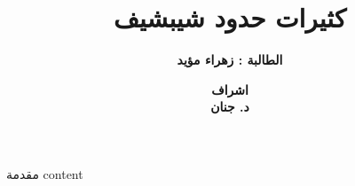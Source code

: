 


	\author{\textbf{الطالبة : زهراء مؤيد}}
	\title{\textbf{كثيرات حدود شيبشيف}}
	\date{\textbf{اشراف\\
		د. جنان}}
	
	\begin{frame}
		\maketitle
	\end{frame}
	
	\begin{frame}{مقدمة}
		content
	\end{frame}
